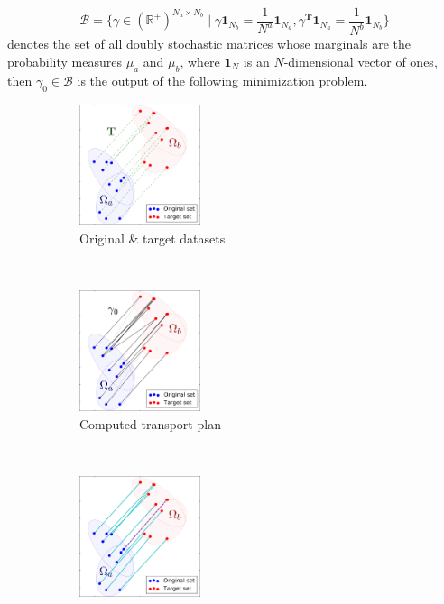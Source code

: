 \begin{equation}
{\mathcal{B} = \big\{ \gamma \in (\mathbb{R}^+)^{N_a\times N_b} \mid \gamma \mathbf{1}_{N_b} = \frac{1}{N^a}\mathbf{1}_{N_a}, \gamma^{\mathbf{T}} \mathbf{1}_{N_a} = \frac{1}{N^b}\mathbf{1}_{N_b}  \big\}}
\end{equation}
denotes the set of all doubly stochastic matrices whose marginals are the probability measures $\mu_a$ and $\mu_b$, where $\mathbf{1}_N$ is an $N$-dimensional vector of ones, then $\gamma_0 \in \mathcal{B}$ is the output of the following minimization problem.

\begin{figure}[t!]
    \centering
    \begin{subfigure}[t]{0.32\textwidth}
        \centering
        \includegraphics[height=1.4in]{6.matching/img/one}
        \caption{{\scriptsize Original \& target datasets}}
        \label{fig:otprob_a}
    \end{subfigure}%
    ~ 
    \begin{subfigure}[t]{0.32\textwidth}
        \centering
        \includegraphics[height=1.4in]{6.matching/img/two}
        \caption{{\scriptsize Computed transport plan}}
        \label{fig:otprob_b}
    \end{subfigure}
    ~
    \begin{subfigure}[t]{0.32\textwidth}
        \centering
        \includegraphics[height=1.4in]{6.matching/img/three}

\end{subfigure}
\end{figure}
